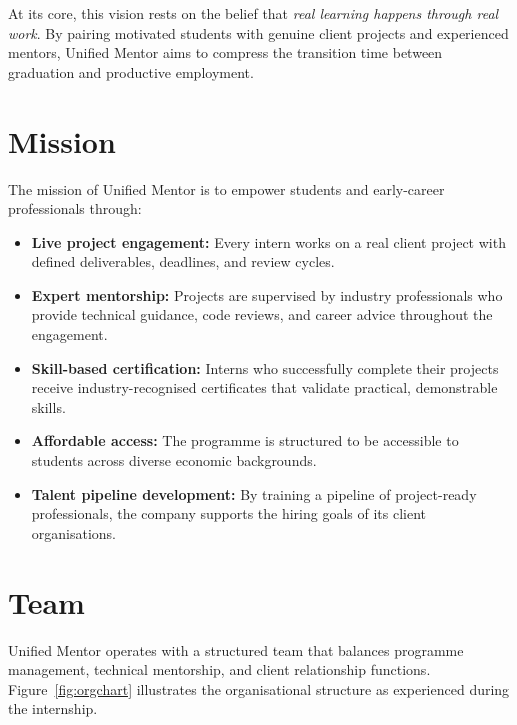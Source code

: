 \documentclass[12pt, a4paper]{report}
\begin{document}
At its core, this vision rests on the belief that \emph{real learning happens
through real work}. By pairing motivated students with genuine client projects
and experienced mentors, Unified Mentor aims to compress the transition time
between graduation and productive employment.

\section{Mission}

The mission of Unified Mentor is to empower students and early-career
professionals through:

\begin{itemize}[leftmargin=1.5em, itemsep=4pt]
  \item \textbf{Live project engagement:} Every intern works on a real client
    project with defined deliverables, deadlines, and review cycles.
  \item \textbf{Expert mentorship:} Projects are supervised by industry
    professionals who provide technical guidance, code reviews, and
    career advice throughout the engagement.
  \item \textbf{Skill-based certification:} Interns who successfully complete
    their projects receive industry-recognised certificates that validate
    practical, demonstrable skills.
  \item \textbf{Affordable access:} The programme is structured to be
    accessible to students across diverse economic backgrounds.
  \item \textbf{Talent pipeline development:} By training a pipeline of
    project-ready professionals, the company supports the hiring goals of
    its client organisations.
\end{itemize}

\section{Team}

Unified Mentor operates with a structured team that balances programme
management, technical mentorship, and client relationship functions.
Figure~\ref{fig:orgchart} illustrates the organisational structure as
experienced during the internship.
\end{document}
